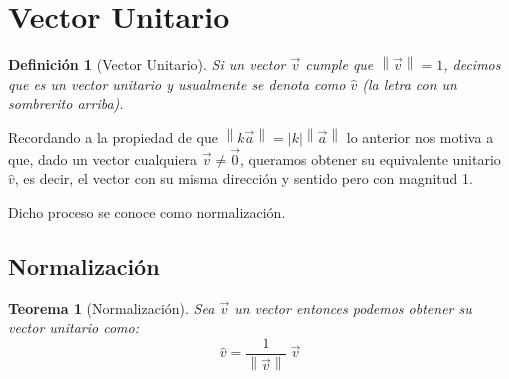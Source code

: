 \documentclass[12pt, fleqn]{report}                             %
\newtheorem{Theorem}{Teorema}[section]                          %
\newtheorem{Definition}{Definición}[section]                    %
\theoremstyle{break}                                            %
\newcommand{\abs}[1]{\left\lvert #1 \right\lvert}               %
\newcommand{\Abs}[1]{\left\lVert #1 \right\lVert}               %
\begin{document}
        \clearpage
        \section{Vector Unitario}

            \begin{Definition}[Vector Unitario]
                Si un vector $\vec{v}$ cumple que $\Abs{\vec{v}} = 1$, decimos que es un
                \emph{vector unitario} y usualmente se denota como $\hat{v}$ (la letra con un sombrerito arriba).
            \end{Definition}

            Recordando a la propiedad de que $\Abs{k\vec{a}} = \abs{k} \Abs{\vec{a}}$ lo anterior
            nos motiva a que, dado un vector cualquiera $\vec{v} \neq \vec{0}$, queramos obtener
            su equivalente unitario $\hat{v}$, es decir, el vector con su misma dirección y sentido
            pero con magnitud 1.

            Dicho proceso se conoce como normalización.

            \subsection{Normalización}
                
                \begin{Theorem}[Normalización]
                    Sea $\vec{v}$ un vector entonces podemos obtener su vector unitario como:
                    \begin{equation}
                        \hat{v} = \dfrac{1}{ \Abs{\vec{v}}} \; \vec{v}
                    \end{equation}
                \end{Theorem}
            
\end{document}
